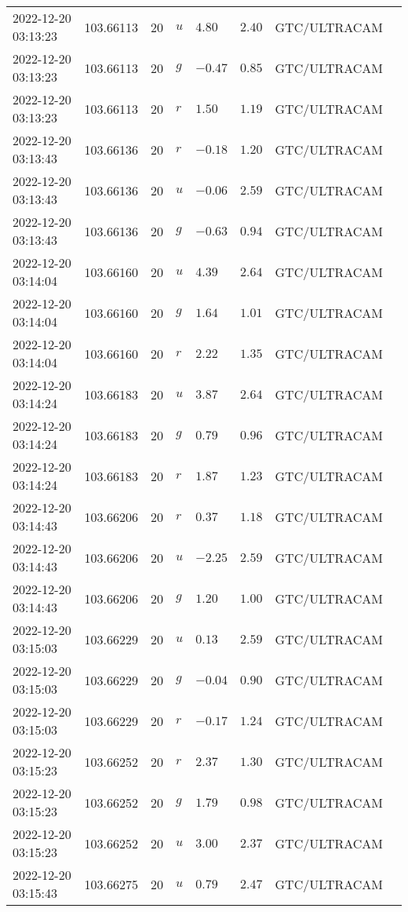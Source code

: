 \documentclass{nature_plusfigure}
\begin{document}
\begin{supplement}
\begin{center}
\begin{longtable}{llllllll}
2022-12-20 03:13:23 & 103.66113 & 20 & $u$ & $4.80$ & $2.40$ & GTC/ULTRACAM &  \\ 
2022-12-20 03:13:23 & 103.66113 & 20 & $g$ & $-0.47$ & $0.85$ & GTC/ULTRACAM &  \\ 
2022-12-20 03:13:23 & 103.66113 & 20 & $r$ & $1.50$ & $1.19$ & GTC/ULTRACAM &  \\ 
2022-12-20 03:13:43 & 103.66136 & 20 & $r$ & $-0.18$ & $1.20$ & GTC/ULTRACAM &  \\ 
2022-12-20 03:13:43 & 103.66136 & 20 & $u$ & $-0.06$ & $2.59$ & GTC/ULTRACAM &  \\ 
2022-12-20 03:13:43 & 103.66136 & 20 & $g$ & $-0.63$ & $0.94$ & GTC/ULTRACAM &  \\ 
2022-12-20 03:14:04 & 103.66160 & 20 & $u$ & $4.39$ & $2.64$ & GTC/ULTRACAM &  \\ 
2022-12-20 03:14:04 & 103.66160 & 20 & $g$ & $1.64$ & $1.01$ & GTC/ULTRACAM &  \\ 
2022-12-20 03:14:04 & 103.66160 & 20 & $r$ & $2.22$ & $1.35$ & GTC/ULTRACAM &  \\ 
2022-12-20 03:14:24 & 103.66183 & 20 & $u$ & $3.87$ & $2.64$ & GTC/ULTRACAM &  \\ 
2022-12-20 03:14:24 & 103.66183 & 20 & $g$ & $0.79$ & $0.96$ & GTC/ULTRACAM &  \\ 
2022-12-20 03:14:24 & 103.66183 & 20 & $r$ & $1.87$ & $1.23$ & GTC/ULTRACAM &  \\ 
2022-12-20 03:14:43 & 103.66206 & 20 & $r$ & $0.37$ & $1.18$ & GTC/ULTRACAM &  \\ 
2022-12-20 03:14:43 & 103.66206 & 20 & $u$ & $-2.25$ & $2.59$ & GTC/ULTRACAM &  \\ 
2022-12-20 03:14:43 & 103.66206 & 20 & $g$ & $1.20$ & $1.00$ & GTC/ULTRACAM &  \\ 
2022-12-20 03:15:03 & 103.66229 & 20 & $u$ & $0.13$ & $2.59$ & GTC/ULTRACAM &  \\ 
2022-12-20 03:15:03 & 103.66229 & 20 & $g$ & $-0.04$ & $0.90$ & GTC/ULTRACAM &  \\ 
2022-12-20 03:15:03 & 103.66229 & 20 & $r$ & $-0.17$ & $1.24$ & GTC/ULTRACAM &  \\ 
2022-12-20 03:15:23 & 103.66252 & 20 & $r$ & $2.37$ & $1.30$ & GTC/ULTRACAM &  \\ 
2022-12-20 03:15:23 & 103.66252 & 20 & $g$ & $1.79$ & $0.98$ & GTC/ULTRACAM &  \\ 
2022-12-20 03:15:23 & 103.66252 & 20 & $u$ & $3.00$ & $2.37$ & GTC/ULTRACAM &  \\ 
2022-12-20 03:15:43 & 103.66275 & 20 & $u$ & $0.79$ & $2.47$ & GTC/ULTRACAM &  \\ 

\end{longtable}
\end{center}
\end{supplement}
\end{document}
